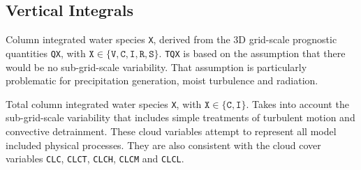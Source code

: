 \subsection{Vertical Integrals}
\begin{description}[leftmargin=3.0cm,style=sameline]
 \item [TQX]      Column integrated water species \texttt{X}, derived from the 3D grid-scale prognostic quantities \texttt{QX}, 
                  with $\texttt{X}\in \{\texttt{V}, \texttt{C}, \texttt{I}, \texttt{R}, \texttt{S}\}$. \texttt{TQX} is based 
                  on the assumption that there would be no sub-grid-scale variability. That assumption is particularly problematic 
                  for precipitation generation, moist turbulence and radiation.

 \item [TQX\_DIA] Total column integrated water species \texttt{X}, with $\texttt{X}\in \{\texttt{C}, \texttt{I}\}$. 
                  Takes into account the sub-grid-scale variability that includes simple treatments of turbulent motion and convective 
                  detrainment. These cloud variables attempt to represent all model included physical processes. They are also 
                  consistent with the cloud cover variables \texttt{CLC}, \texttt{CLCT}, \texttt{CLCH}, \texttt{CLCM} and \texttt{CLCL}. 
\end{description}

